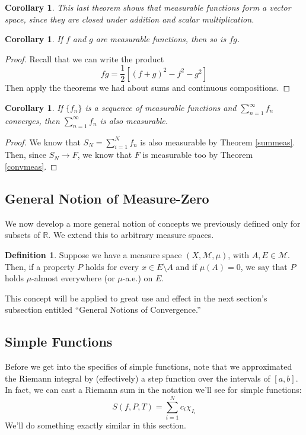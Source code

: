 \documentclass[12pt]{article}
\theoremstyle{plain}
\newtheorem{cor}[thm]{Corollary}
\theoremstyle{definition}
\newtheorem{defn}[thm]{Definition}
\theoremstyle{remark}
\begin{document}
\begin{cor}
This last theorem shows that measurable functions form a \emph{vector space}, since they are closed under addition and scalar multiplication.
\end{cor}

\begin{cor}
If $f$ and $g$ are measurable functions, then so is $fg$.
\end{cor}
\begin{proof}
Recall that we can write the product
\[ 
    fg = \frac{1}{2}\left[(f+g)^2 - f^2 - g^2\right]
\]
Then apply the theorems we had about sums and continuous compositions.
\end{proof}

\begin{cor}
If $\{f_n\}$ is a sequence of measurable functions and $\sum^\infty_{n=1} f_n$ converges, then $\sum^\infty_{n=1} f_n$ is also measurable. 
\end{cor}
\begin{proof}
We know that $S_N = \sum^N_{i=1} f_n$ is also measurable by Theorem \ref{summeas}. Then, since $S_N\rightarrow F$, we know that $F$ is measurable too by Theorem \ref{convmeas}.
\end{proof}


\subsection{General Notion of Measure-Zero}

We now develop a more general notion of concepts we previously defined only for subsets of $\mathbb{R}$. We extend this to arbitrary measure spaces.

\begin{defn}
Suppose we have a measure space $(X,\mathscr{M},\mu)$, with $A, E\in\mathscr{M}$. Then, if a property $P$ holds for every $x\in E\setminus A$ and if $\mu(A)=0$, we say that $P$ holds $\mu$-almost everywhere (or $\mu$-a.e.) on $E$.
\end{defn}

This concept will be applied to great use and effect in the next section's subsection entitled ``General Notions of Convergence.''

\newpage
\subsection{Simple Functions}

Before we get into the specifics of simple functions, note that we approximated the Riemann integral by (effectively) a step function over the intervals of $[a,b]$. In fact, we can cast a Riemann sum in the notation we'll see for simple functions:
    \[ S(f,P,T) = \sum^N_{i=1} c_i \chi_{I_i} \]
We'll do something exactly similar in this section.
\end{document}
